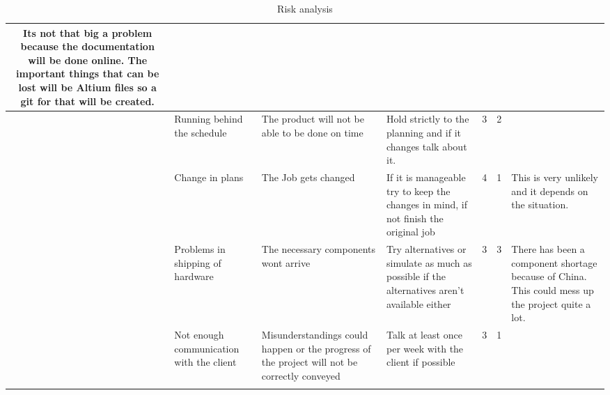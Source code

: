 \begin{longtable}{| c | p{3cm} | p{3cm} | p{4cm} | c | c | p{3cm} |}
    \cellcolor{lightgray}Its not that big a problem because the documentation will be done online. The important things that can be lost will be Altium files so a git for that will be created.
    \\ \hline
    \rowcolor{cyan}\theriskTableCounter{} &
    \stepcounter{riskTableCounter}
    Running behind the schedule&
    The product will not be able to be done on time&
    Hold strictly to the planning and if it changes talk about it.&
    \cellcolor{yellow}3&
    \cellcolor{lime}2&
    \cellcolor{lightgray}
    \\ \hline
    \rowcolor{teal}\theriskTableCounter{} &
    \stepcounter{riskTableCounter}
    Change in plans&
    The Job gets changed&
    If it is manageable try to keep the changes in mind, if not finish the original job&
    \cellcolor{orange}4&
    \cellcolor{green}1&
    \cellcolor{lightgray}This is very unlikely and it depends on the situation. 
    \\ \hline
    \rowcolor{cyan}\theriskTableCounter{} &
    \stepcounter{riskTableCounter}
    Problems in shipping of hardware&
    The necessary components wont arrive&
    Try alternatives or simulate as much as possible if the alternatives aren't available either&
    \cellcolor{yellow}3&
    \cellcolor{yellow}3&
    \cellcolor{lightgray}There has been a component shortage because of China. This could mess up the project quite a lot.
    \\ \hline
    \rowcolor{teal}\theriskTableCounter{} &
    \stepcounter{riskTableCounter}
    Not enough communication with the client&
    Misunderstandings could happen or the progress of the project will not be correctly conveyed&
    Talk at least once per week with the client if possible&
    \cellcolor{yellow}3&
    \cellcolor{lime}1&\cellcolor{lightgray}
    \\ \hline
    \caption{Risk analysis}
    \label{tab:risico_analyse}
\end{longtable}


\newpage

